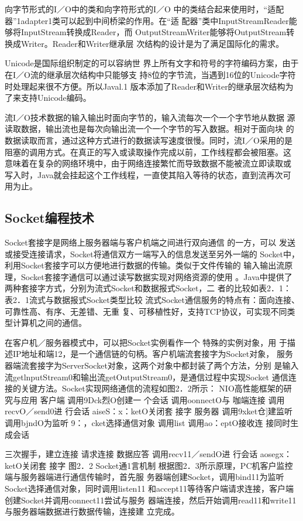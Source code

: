 向字节形式的I／O中的类和向字符形式的I／O
中的类结合起来使用时，“适配器”1adapter1类可以起到中间桥梁的作用。在“适
配器”类中InputStreamReader能够将InputStream转换成Reader，而
OutputStreamWriter能够将OutputStream转换成Writer。Reader和Writer继承层
次结构的设计是为了满足国际化的需求。

Unicode是国际组织制定的可以容纳世
界上所有文字和符号的字符编码方案，由于在I／O流的继承层次结构中只能够支
持8位的字节流，当遇到16位的Unicode字符时处理起来很不方便。所以Javal.1
版本添加了Reader和Writer的继承层次结构为了来支持Unicode编码。

流I／O技术数据的输入输出时面向字节的，输入流每次一个一个字节地从数据
源读取数据，输出流也是每次向输出流一个一个字节的写入数据。相对于面向块
的数据读取而言，通过这种方式进行的数据读写速度很慢。同时，流I／O采用的是
阻塞的调用方式。在真正的写入或读取操作完成以前，工作线程都会被阻塞。这
意味着在复杂的网络环境中，由于网络连接繁忙而导致数据不能被流立即读取或
写入时，Java就会挂起这个工作线程，一直使其陷入等待的状态，直到流再次可
用为止。
\subsection{Socket编程技术}
Socket套接字是网络上服务器端与客户机端之间进行双向通信
的一方，可以
发送或接受连接请求，Socket将通信双方一端写入的信息发送至另外一端的
Socket中，利用Socket套接字可以方便地进行数据的传输。类似于文件传输的
输入输出流原理，Socket套接字通信可以通过读写数据实现对网络资源的使用
。Java中提供了两种套接字方式，分别为流式Socket和数据报式Socket，二
者的比较如表2．1：
表2．1流式与数据报式Socket类型比较
流式Socket通信服务的特点有：面向连接、可靠性高、有序、无差错、无重
复、可移植性好，支持TCP协议，可实现不同类型计算机之间的通信。

在客户机／服务器模式中，可以把Socket实例看作一个
特殊的实例对象，用
于描述IP地址和端12，是一个通信链的句柄。客户机端流套接字为Socket对象，
服务器端流套接字为ServerSocket对象，这两个对象中都封装了两个方法，分别
是输入流getlnputStream0和输出流getOutputStream0，是通信过程中实现Socket
通信连接的关键方法。Socket实现网络通信的流程如图2．2所示：
NIO高性能框架的研究与应用
客户端
调用9Dck烈O创建一
个会话
调用oonnectO与
咖端连接
调用recvO／send0进
行会话
aiseS：x：ketO关闭套
接字
服务器
调用9xket仓]建监听
调用bjndO为监听
9：，cket选择通信对象
调用list
调用ao：eptO接收连
接同时生成会话


三次握手，建立连接
请求连接
数据应答
调用recv11／sendO进
行会话
aosegx：ketO关闭套
接字
图2．2 Socket通1言机制
根据图2．3所示原理，PC机客户监控端与服务器端进行通信传输时，首先服
务器端创建Socket，调用bind11为监听Socket选择通信对象，同时调用listen11
和accept11等待客户端请求连接，客户端创建Socket并调用connect11尝试与服务
器端连接，然后开始调用read11和write11与服务器端数据进行数据传输，连接建
立完成。

